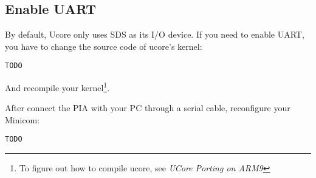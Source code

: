 \documentclass[a4paper]{article}
\begin{document}
\subsection{Enable UART}
By default, Ucore only uses SDS as its I/O device. If you need
to enable UART, you have to change the source code of ucore's kernel:

\begin{verbatim}
TODO
\end{verbatim}

And recompile your kernel\footnote{To figure out how to compile
ucore, see \emph{UCore Porting on ARM9}}.

After connect the PIA with your PC through a serial cable, 
reconfigure your Minicom:

\begin{verbatim}
TODO
\end{verbatim}
\end{document}
